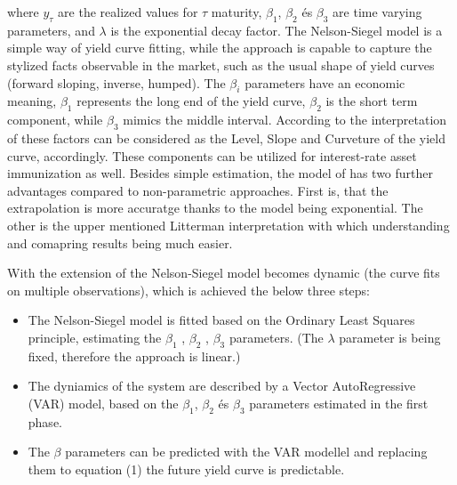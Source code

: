 \documentclass[12pt,bibliography=totoc]{article}
\begin{document}
where $y_{\tau}$ are the realized values for $\tau$ maturity, $\beta_{1}$, $\beta_{2}$ és $\beta_{3}$ are time varying parameters, and $\lambda$ is the exponential decay factor.
The Nelson-Siegel model is a simple way of yield curve fitting, while the approach is capable to capture the stylized facts observable in the market, such as the usual shape of yield curves (forward sloping, inverse, humped).
The $\beta_{i}$ parameters have an economic meaning, $\beta_{1}$ represents the long end of the yield curve,  $\beta_{2}$ is the short term component, while $\beta_{3}$ mimics the middle interval. According to the interpretation of \cite{litterman1991common} these factors can be considered as the Level, Slope and Curveture of the yield curve, accordingly. These components can be utilized for interest-rate asset immunization as well. Besides simple estimation, the model of \cite{diebold2006forecasting} has two further advantages compared to non-parametric approaches. First is, that the extrapolation is more accuratge thanks to the model being exponential. The other is the upper mentioned Litterman interpretation with which understanding and comapring results being much easier.
 
With the extension of \cite{diebold2006forecasting} the Nelson-Siegel model becomes dynamic (the curve fits on multiple observations), which is achieved  the below three steps:

\begin{itemize}
\item The Nelson-Siegel model is fitted based on the Ordinary Least Squares principle, estimating the $\beta_{1}$ ,  $\beta_{2}$ ,  $\beta_{3}$  parameters. (The $\lambda$ parameter is being fixed, therefore the approach is linear.)
\item The dyniamics of the system are described by a Vector AutoRegressive (VAR) model, based on the $\beta_{1}$,  $\beta_{2}$ és $\beta_{3}$ parameters estimated in the first phase.
\item The $\beta$ parameters can be predicted with the VAR modellel and replacing them to  equation (1) the future yield curve is predictable.

\end{itemize}
\end{document}
